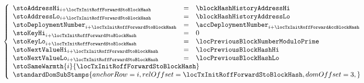 \item[\underline{Storing the previous \inst{BLOCKHASH} in the state:}] 
	\[
		\left\{ \begin{array}{lclr}
			\stoAddressHi         _{i + \locTxInitRoffForwardStoBlockHash} & = & \blockHashHistoryAddressHi                                    \\
			\stoAddressLo         _{i + \locTxInitRoffForwardStoBlockHash} & = & \blockHashHistoryAddressLo                                    \\
			\stoDeploymentNumber  _{i + \locTxInitRoffForwardStoBlockHash} & = & \accDeploymentNumber _{i + \locTxInitRoffForwardAccBlockHash} \\
			\stoKeyHi             _{i + \locTxInitRoffForwardStoBlockHash} & = & 0                                                             \\
			\stoKeyLo             _{i + \locTxInitRoffForwardStoBlockHash} & = & \locPreviousBlockNumberModuloPrime                            \\
			\stoNextValueHi       _{i + \locTxInitRoffForwardStoBlockHash} & = & \locPreviousBlockHashHi                                       \\
			\stoNextValueLo       _{i + \locTxInitRoffForwardStoBlockHash} & = & \locPreviousBlockHashLo                                       \\
			\multicolumn{3}{l}{\stoSameWarmth  {i}{\locTxInitRoffForwardStoBlockHash} } \\
			\multicolumn{3}{l}{
				\standardDomSubStamps {
					anchorRow = i                                 ,
					relOffset = \locTxInitRoffForwardStoBlockHash ,
					domOffset = 3                                 ,
				}} \\
		\end{array} \right.
	\]
